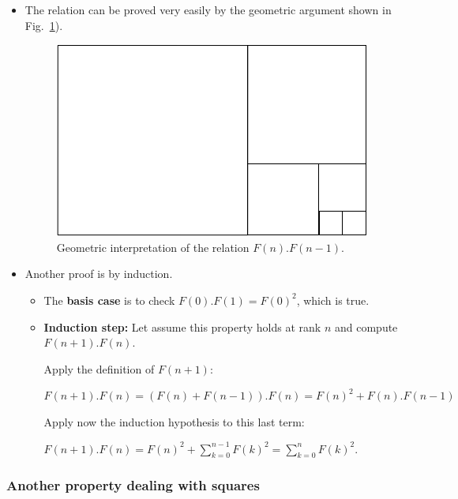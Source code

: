 \begin{itemize}

\item The relation  
can be proved very easily by the geometric argument shown in Fig.~\ref{fig:fibosquare}). 

\begin{figure}[h]
\begin{center}
        \includegraphics[scale=0.5]{FiguresMaths//Fiboembedded}
        \caption{Geometric interpretation of the relation $F(n).F(n-1)$.}
        \label{fig:fibosquare}
\end{center}
\end{figure}

\item
Another proof is by induction.

\begin{itemize}
\item
The \textbf{basis case} is to check $F(0).F(1) = F(0)^2$, which is true.

\item
\textbf{Induction step:} Let assume this property holds at rank $n$ and compute $F(n+1).F(n)$.

Apply the definition of $F(n+1)$:

 $F(n+1).F(n) =  (F(n)+F(n-1)).F(n) = F(n)^2 +  F(n).F(n-1)$
 
 Apply now the induction hypothesis to this last term:
 
 $F(n+1).F(n) = F(n)^2 + \sum_{k=0}^{n-1} F(k)^2 = \sum_{k=0}^{n} F(k)^2$.
 \end{itemize}

\end{itemize}

\subsubsection{Another property dealing with squares}

